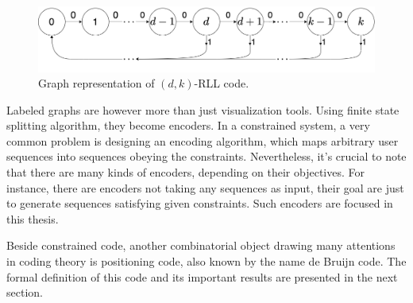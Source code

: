 \begin{figure}[htbp]
    \centering
    \includegraphics[scale=0.4]{fig/RLL.png}
    \caption{Graph representation of $(d,k)$-RLL code.}
    \label{fig:d_k_RLL}
\end{figure}

Labeled graphs are however more than just visualization tools. Using finite state splitting algorithm, they become encoders. In a constrained system, a very common problem is designing an encoding algorithm, which maps arbitrary user sequences into sequences obeying the constraints. Nevertheless, it's crucial to note that there are many kinds of encoders, depending on their objectives. For instance, there are encoders not taking any sequences as input, their goal are just to generate sequences satisfying given constraints. Such encoders are focused in this thesis. 

Beside constrained code, another combinatorial object drawing many attentions in coding theory is positioning code, also known by the name de Bruijn code. The formal definition of this code and its important results are presented in the next section.




